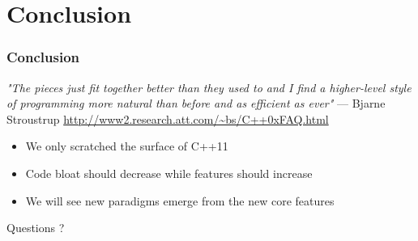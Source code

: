 \documentclass[xcolor=dvipsnames]{beamer}
\begin{document}
\section{Conclusion}
\begin{frame}
  \frametitle{Conclusion}

  \emph{"The pieces just fit together better than they used to and I find a
  higher-level style of programming more natural than before and as efficient as ever"}
  --- Bjarne Stroustrup {\footnotesize \url{http://www2.research.att.com/~bs/C++0xFAQ.html}}

  \begin{itemize}
    \item We only scratched the surface of C++11
    \item Code bloat should decrease while features should increase 
    \item We will see new paradigms emerge from the new core features
  \end{itemize}

\end{frame}

\begin{frame}
  Questions ?
\end{frame}
\end{document}
